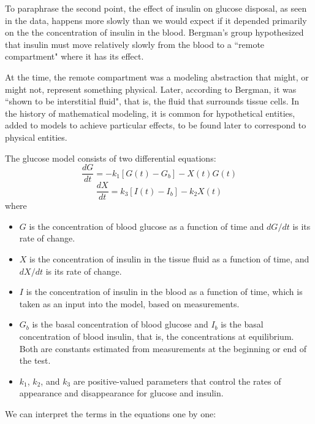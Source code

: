 \documentclass[12pt]{book}
\theoremstyle{exercise}
\begin{document}
To paraphrase the second point, the effect of insulin on glucose disposal, as seen in the data, happens more slowly than we would expect if it depended primarily on the the concentration of insulin in the blood.  Bergman's group hypothesized that insulin must move relatively slowly from the blood to a ``remote compartment" where it has its effect.


At the time, the remote compartment was a modeling abstraction that might, or might not, represent something physical.  Later, according to Bergman, it was ``shown to be interstitial fluid", that is, the fluid that surrounds tissue cells.  In the history of mathematical modeling, it is common for hypothetical entities, added to models to achieve particular effects, to be found later to correspond to physical entities.


The glucose model consists of two differential equations:
%
\[ \frac{dG}{dt} = -k_1 \left[ G(t) - G_b \right] - X(t) G(t)  \]
%
\[ \frac{dX}{dt} = k_3 \left[I(t) - I_b \right] - k_2 X(t) \]
%
where

\begin{itemize}

\item $G$ is the concentration of blood glucose as a function of time and $dG/dt$ is its rate of change.

\item $X$ is the concentration of insulin in the tissue fluid as a function of time, and $dX/dt$ is its rate of change.

\item $I$ is the concentration of insulin in the blood as a function of time, which is taken as an input into the model, based on measurements.

\item $G_b$ is the basal concentration of blood glucose and $I_b$ is the basal concentration of blood insulin, that is, the concentrations at equilibrium.  Both are constants estimated from measurements at the beginning or end of the test.

\item $k_1$, $k_2$, and $k_3$ are positive-valued parameters that control the rates of appearance and disappearance for glucose and insulin. 

\end{itemize}

We can interpret the terms in the equations one by one:
\end{document}
